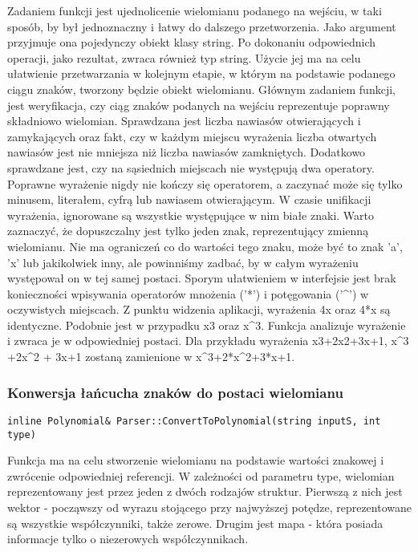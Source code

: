 \documentclass[twoside,a4paper]{book}
\begin{document}
Zadaniem funkcji jest ujednolicenie wielomianu podanego na wejściu, w taki sposób, by był jednoznaczny i łatwy do dalszego przetworzenia. Jako argument przyjmuje ona pojedynczy obiekt klasy string. Po dokonaniu odpowiednich operacji, jako rezultat, zwraca również typ string. Użycie jej ma na celu ułatwienie przetwarzania w kolejnym etapie, w którym na podstawie podanego ciągu znaków, tworzony będzie obiekt wielomianu. Głównym zadaniem funkcji, jest weryfikacja, czy ciąg znaków podanych na wejściu reprezentuje poprawny składniowo wielomian. Sprawdzana jest liczba nawiasów otwierających i zamykających oraz fakt, czy w każdym miejscu wyrażenia liczba otwartych nawiasów jest nie mniejsza niż liczba nawiasów zamkniętych. Dodatkowo sprawdzane jest, czy na sąsiednich miejscach nie występują dwa operatory. Poprawne wyrażenie nigdy nie kończy się operatorem, a zaczynać może się tylko minusem, literałem, cyfrą lub nawiasem otwierającym. W czasie unifikacji wyrażenia, ignorowane są wszystkie występujące w nim białe znaki. Warto zaznaczyć, że dopuszczalny jest tylko jeden znak, reprezentujący zmienną wielomianu. Nie ma ograniczeń co do wartości tego znaku, może być to znak 'a', 'x' lub jakikolwiek inny, ale powinniśmy zadbać, by w całym wyrażeniu występował on w tej samej postaci. Sporym ułatwieniem w interfejsie jest brak konieczności wpisywania operatorów mnożenia ('*') i potęgowania ('\^{}') w oczywistych miejscach. Z punktu widzenia aplikacji, wyrażenia 4x oraz 4*x są identyczne. Podobnie jest w przypadku x3 oraz x\^{}3. Funkcja analizuje wyrażenie i zwraca je w odpowiedniej postaci. Dla przykładu wyrażenia x3+2x2+3x+1, x\^{}3 +2x\^{}2 + 3x+1 zostaną zamienione w x\^{}3+2*x\^{}2+3*x+1.
\\

\subsubsection{Konwersja łańcucha znaków do postaci wielomianu}
\begin{lstlisting}
inline Polynomial& Parser::ConvertToPolynomial(string inputS, int type)
\end{lstlisting}

Funkcja ma na celu stworzenie wielomianu na podstawie wartości znakowej i zwrócenie odpowiedniej referencji. W zależności od parametru type, wielomian reprezentowany jest przez jeden z dwóch rodzajów struktur. Pierwszą z nich jest wektor - począwszy od wyrazu stojącego przy najwyższej potędze, reprezentowane są wszystkie współczynniki, także zerowe. Drugim jest mapa - która posiada informacje tylko o niezerowych współczynnikach.
\end{document}
